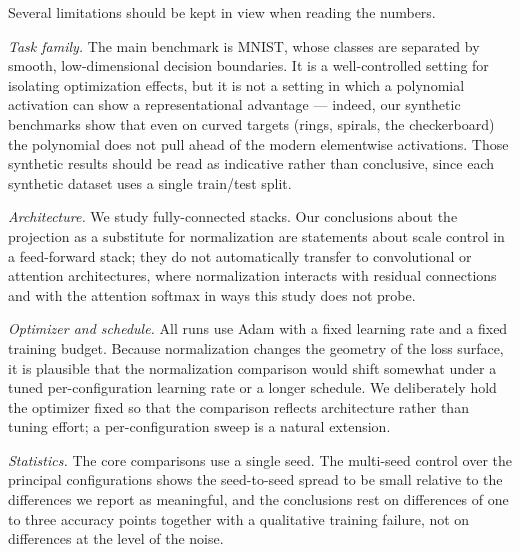 Several limitations should be kept in view when reading the numbers.

\emph{Task family.} The main benchmark is MNIST, whose classes are separated
by smooth, low-dimensional decision boundaries. It is a well-controlled
setting for isolating optimization effects, but it is not a setting in which a
polynomial activation can show a representational advantage --- indeed, our
synthetic benchmarks show that even on curved targets (rings, spirals, the
checkerboard) the polynomial does not pull ahead of the modern elementwise
activations. Those synthetic results should be read as indicative rather than
conclusive, since each synthetic dataset uses a single train/test split.

\emph{Architecture.} We study fully-connected stacks. Our conclusions about
the projection as a substitute for normalization are statements about
scale control in a feed-forward stack; they do not automatically transfer to
convolutional or attention architectures, where normalization interacts with
residual connections and with the attention softmax in ways this study does
not probe.

\emph{Optimizer and schedule.} All runs use Adam with a fixed learning rate
and a fixed training budget. Because normalization changes the geometry of the
loss surface, it is plausible that the normalization comparison would shift
somewhat under a tuned per-configuration learning rate or a longer schedule.
We deliberately hold the optimizer fixed so that the comparison reflects
architecture rather than tuning effort; a per-configuration sweep is a natural
extension.

\emph{Statistics.} The core comparisons use a single seed. The multi-seed
control over the principal configurations shows the seed-to-seed spread to be
small relative to the differences we report as meaningful, and the conclusions
rest on differences of one to three accuracy points together with a
qualitative training failure, not on differences at the level of the noise.
